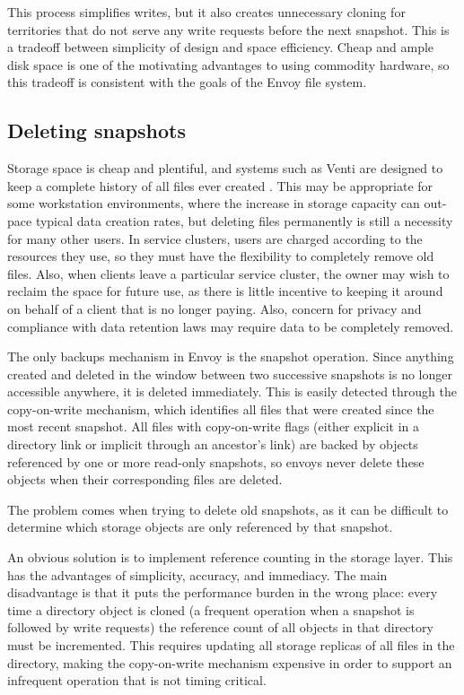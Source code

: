This process simplifies writes, but it also creates unnecessary cloning for territories that do not serve any write requests before the next snapshot. This is a tradeoff between simplicity of design and space efficiency. Cheap and ample disk space is one of the motivating advantages to using commodity hardware, so this tradeoff is consistent with the goals of the Envoy file system.

\subsection{Deleting snapshots}

Storage space is cheap and plentiful, and systems such as Venti are designed to keep a complete history of all files ever created \cite{quinlan}. This may be appropriate for some workstation environments, where the increase in storage capacity can out-pace typical data creation rates, but deleting files permanently is still a necessity for many other users. In service clusters, users are charged according to the resources they use, so they must have the flexibility to completely remove old files. Also, when clients leave a particular service cluster, the owner may wish to reclaim the space for future use, as there is little incentive to keeping it around on behalf of a client that is no longer paying. Also, concern for privacy and compliance with data retention laws may require data to be completely removed.

The only backups mechanism in Envoy is the snapshot operation. Since anything created and deleted in the window between two successive snapshots is no longer accessible anywhere, it is deleted immediately. This is easily detected through the copy-on-write mechanism, which identifies all files that were created since the most recent snapshot. All files with copy-on-write flags (either explicit in a directory link or implicit through an ancestor's link) are backed by objects referenced by one or more read-only snapshots, so envoys never delete these objects when their corresponding files are deleted.

The problem comes when trying to delete old snapshots, as it can be difficult to determine which storage objects are only referenced by that snapshot.

An obvious solution is to implement reference counting in the storage layer. This has the advantages of simplicity, accuracy, and immediacy. The main disadvantage is that it puts the performance burden in the wrong place: every time a directory object is cloned (a frequent operation when a snapshot is followed by write requests) the reference count of all objects in that directory must be incremented. This requires updating all storage replicas of all files in the directory, making the copy-on-write mechanism expensive in order to support an infrequent operation that is not timing critical.


